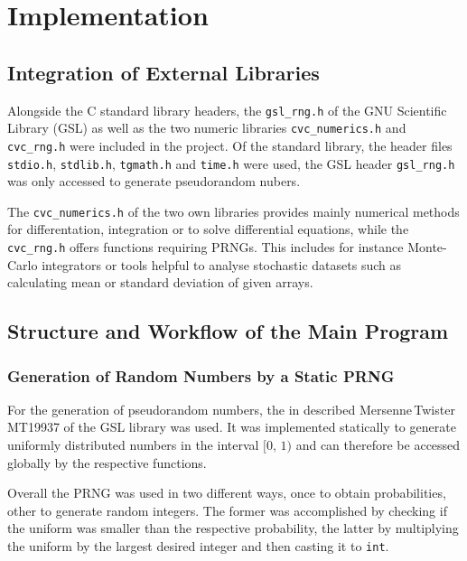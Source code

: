 \section{Implementation}

\subsection{Integration of External Libraries}

Alongside the C standard library headers, the \texttt{gsl\_rng.h} of the GNU Scientific Library (GSL) as well as the two numeric libraries \texttt{cvc\_numerics.h} and \texttt{cvc\_rng.h} were included in the project. 
Of the standard library, the header files \texttt{stdio.h}, \texttt{stdlib.h}, \texttt{tgmath.h} and \texttt{time.h} were used, the GSL header \texttt{gsl\_rng.h} was only accessed to generate pseudorandom nubers. 

The \texttt{cvc\_numerics.h} of the two own libraries provides mainly numerical methods for differentation, integration or to solve differential equations, while the \texttt{cvc\_rng.h} offers functions requiring PRNGs.
This includes for instance Monte-Carlo integrators or tools helpful to analyse stochastic datasets such as calculating mean or standard deviation of given arrays.


\subsection{Structure and Workflow of the Main Program}

\subsubsection{Generation of Random Numbers by a Static PRNG}

For the generation of pseudorandom numbers, the in  described Mer\-sen\-ne\,Twis\-ter MT19937 of the GSL library was used. It was implemented statically 
to generate uniformly distributed numbers in the interval $[0,\,1)$ and can therefore be accessed globally by the respective functions. 

Overall the PRNG was used in two different ways, once to obtain probabilities, other to generate random integers.
The former was accomplished by checking if the uniform was smaller than the respective probability, the latter by multiplying the uniform by the largest desired integer and then casting it to \texttt{int}.


